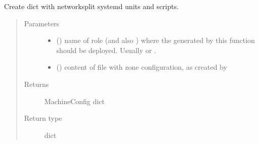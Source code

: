 \documentclass[letterpaper,10pt,english]{sphinxmanual}
\begin{document}
\begin{fulllineitems}
\label{\detokenize{ocpnetsplit:ocpnetsplit.machineconfig.create_mc_dict}}
Create  dict with network\sphinxhyphen{}split systemd units and scripts.
\begin{quote}\begin{description}
\item[{Parameters}] \leavevmode\begin{itemize}
\item {} 
 () \textendash{} name of  role (and also
) where the  generated by
this function should be deployed. Usually  or .

\item {} 
 () \textendash{} content of  file with zone
configuration, as created by
{\hyperref[\detokenize{ocpnetsplit:ocpnetsplit.zone.ZoneConfig.get_env_file}]{}}

\end{itemize}

\item[{Returns}] \leavevmode
MachineConfig dict

\item[{Return type}] \leavevmode
dict

\end{description}\end{quote}

\end{fulllineitems}

\end{document}

